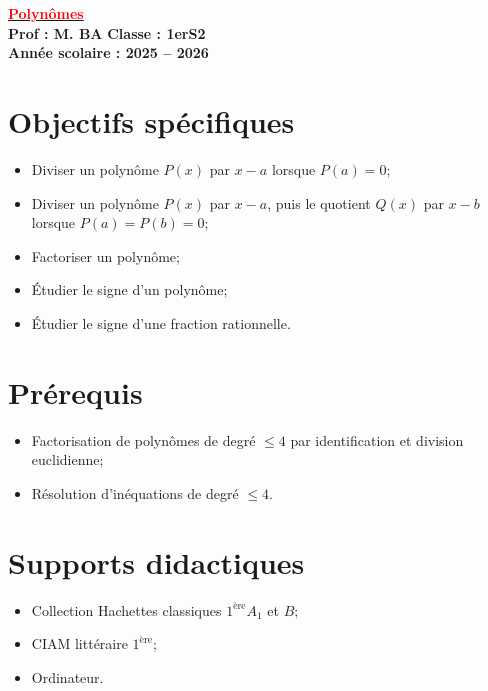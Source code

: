 \documentclass[12pt,a4paper]{article}
\newcounter{solution}
\begin{document}
\begin{center}
    \Large\textbf{\underline{\textcolor{red}{Polynômes}}}\\[-0.1cm]
    \normalsize\textbf{Prof : M. BA} \hfill \textbf{Classe : 1erS2}\\[-0.1cm]
    \textbf{Année scolaire : 2025 -- 2026}
\end{center}

\section*{Objectifs spécifiques}
\begin{itemize}[label=$\checkmark$]
    \item Diviser un polynôme \( P(x) \) par \( x - a \) lorsque \( P(a) = 0 \);
    \item Diviser un polynôme \( P(x) \) par \( x - a \), puis le quotient \( Q(x) \) par \( x - b \) lorsque \( P(a) = P(b) = 0 \);
    \item Factoriser un polynôme;
    \item Étudier le signe d'un polynôme;
    \item Étudier le signe d'une fraction rationnelle.
\end{itemize}

\section*{Prérequis}
\begin{itemize}[label=$\checkmark$]
    \item Factorisation de polynômes de degré \( \leq 4 \) par identification et division euclidienne;
    \item Résolution d'inéquations de degré \( \leq 4 \).
\end{itemize}

\section*{Supports didactiques}
\begin{itemize}[label=$\checkmark$]
    \item Collection Hachettes classiques \( 1^{\text{ère}} A_1 \) et \( B \);
    \item CIAM littéraire \( 1^{\text{ère}} \);
    \item Ordinateur.
\end{itemize}
\end{document}
